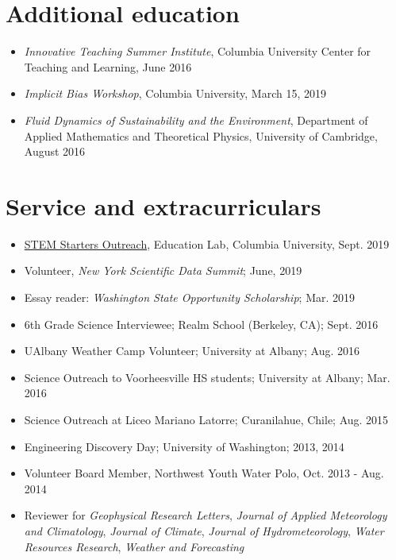 \documentclass[letterpaper]{article}
\begin{document}
\section{Additional education}
\label{sec:org6506402}
\begin{itemize}
\item \emph{Innovative Teaching Summer Institute}, Columbia University Center
  for Teaching and Learning, June 2016
\item \emph{Implicit Bias Workshop}, Columbia University, March 15, 2019
\item \emph{Fluid Dynamics of Sustainability and the Environment}, Department
  of Applied Mathematics and Theoretical Physics, University of
  Cambridge, August 2016
\end{itemize}

\section{Service and extracurriculars}
\label{sec:org4d93625}

\begin{itemize}
\item \href{https://zuckermaninstitute.columbia.edu/stem-starters}{STEM Starters Outreach}, Education Lab, Columbia University, Sept. 2019
\item Volunteer, \emph{New York Scientific Data Summit}; June, 2019
\item Essay reader: \emph{Washington State Opportunity Scholarship}; Mar. 2019
\item 6th Grade Science Interviewee; Realm School (Berkeley, CA); Sept. 2016
\item UAlbany Weather Camp Volunteer; University at Albany; Aug. 2016
\item Science Outreach to Voorheesville HS students; University at Albany; Mar. 2016
\item Science Outreach at Liceo Mariano Latorre; Curanilahue, Chile; Aug. 2015
\item Engineering Discovery Day; University of Washington; 2013, 2014
\item Volunteer Board Member, Northwest Youth Water Polo, Oct. 2013 - Aug. 2014
\item Reviewer for \emph{Geophysical Research Letters}, \emph{Journal of Applied
    Meteorology and Climatology}, \emph{Journal of Climate}, \emph{Journal of
    Hydrometeorology}, \emph{Water Resources Research}, \emph{Weather and
    Forecasting}
\end{itemize}

\nocite{*}
\printbibheading
\bibbycategory
\end{document}
